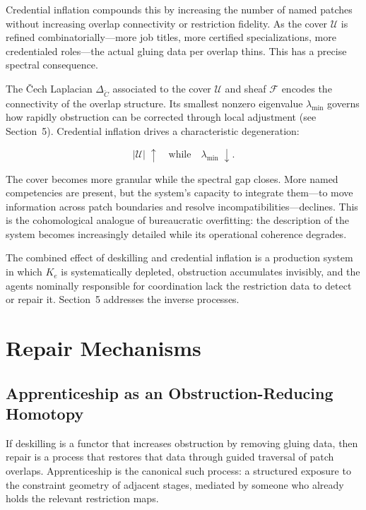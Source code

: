 \documentclass[12pt]{article}
\begin{document}
Credential inflation compounds this by increasing the number of named patches without increasing overlap connectivity or restriction fidelity. As the cover $\mathcal{U}$ is refined combinatorially---more job titles, more certified specializations, more credentialed roles---the actual gluing data per overlap thins. This has a precise spectral consequence.

The Čech Laplacian $\Delta_{\check{C}}$ associated to the cover $\mathcal{U}$ and sheaf $\mathcal{F}$ encodes the connectivity of the overlap structure. Its smallest nonzero eigenvalue $\lambda_{\min}$ governs how rapidly obstruction can be corrected through local adjustment (see Section~5). Credential inflation drives a characteristic degeneration:

\begin{equation}
|\mathcal{U}| \;\uparrow \quad \text{while} \quad \lambda_{\min} \;\downarrow.
\end{equation}

The cover becomes more granular while the spectral gap closes. More named competencies are present, but the system's capacity to integrate them---to move information across patch boundaries and resolve incompatibilities---declines. This is the cohomological analogue of bureaucratic overfitting: the description of the system becomes increasingly detailed while its operational coherence degrades.

The combined effect of deskilling and credential inflation is a production system in which $K_e$ is systematically depleted, obstruction accumulates invisibly, and the agents nominally responsible for coordination lack the restriction data to detect or repair it. Section~5 addresses the inverse processes.

\section{Repair Mechanisms}

\subsection{Apprenticeship as an Obstruction-Reducing Homotopy}

If deskilling is a functor that increases obstruction by removing gluing data, then repair is a process that restores that data through guided traversal of patch overlaps. Apprenticeship is the canonical such process: a structured exposure to the constraint geometry of adjacent stages, mediated by someone who already holds the relevant restriction maps.
\end{document}
